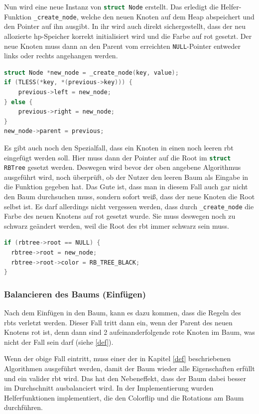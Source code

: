 \documentclass[11pt]{article}
\newcommand{\lstin}[1]{\lstinline[language=C]{#1}}
\begin{document}
Nun wird eine neue Instanz von \lstin{struct Node} erstellt. Das erledigt die Helfer-Funktion \lstin{_create_node}, welche den neuen Knoten auf dem Heap abspeichert und den Pointer auf ihn ausgibt.
In ihr wird auch direkt sichergestellt, dass der neu allozierte \gls{hp}-Speicher korrekt initialisiert wird und die Farbe auf rot gesetzt.
Der neue Knoten muss dann an den Parent vom erreichten \lstin{NULL}-Pointer entweder links oder rechts angehangen werden.

\begin{lstlisting}[language=C]
struct Node *new_node = _create_node(key, value);
if (TLESS(*key, *(previous->key))) {
    previous->left = new_node;
} else {
    previous->right = new_node;
}
new_node->parent = previous;
\end{lstlisting}

Es gibt auch noch den Spezialfall, dass ein Knoten in einen noch leeren \gls{rbt} eingefügt werden soll.
Hier muss dann der Pointer auf die Root im \lstin{struct RBTree} gesetzt werden. Deswegen wird bevor der oben angebene Algorithmus ausgeführt wird, noch überprüft,
ob der Nutzer den leeren Baum als Eingabe in die Funktion gegeben hat.
Das Gute ist, dass man in diesem Fall auch gar nicht den Baum durchsuchen muss, sondern sofort weiß, dass der neue Knoten die Root selbst ist.
Es darf allerdings nicht vergessen werden, dass durch \lstin{_create_node} die Farbe des neuen Knotens auf rot gesetzt wurde. Sie muss deswegen noch zu schwarz geändert werden,
weil die Root des \gls{rbt} immer schwarz sein muss.
\begin{lstlisting}[language=C]
if (rbtree->root == NULL) {
  rbtree->root = new_node;
  rbtree->root->color = RB_TREE_BLACK;
}
\end{lstlisting}

\subsubsection{Balancieren des Baums (Einfügen)}
Nach dem Einfügen in den Baum, kann es dazu kommen, dass die Regeln des \glspl{rbt} verletzt werden.
Dieser Fall tritt dann ein, wenn der Parent des neuen Knotens rot ist, denn dann sind 2 aufeinanderfolgende rote Knoten im Baum, was nicht der Fall sein darf (siehe \ref{def}).

Wenn der obige Fall eintritt, muss einer der in Kapitel \ref{def} beschriebenen Algorithmen ausgeführt werden, damit der Baum wieder alle Eigenschaften erfüllt und ein valider \gls{rbt} wird.
Das hat den Nebeneffekt, dass der Baum dabei besser im Durchschnitt ausbalanciert wird.
In der Implementierung wurden Helferfunktionen implementiert, die den Colorflip und die Rotations am Baum durchführen.
\end{document}
